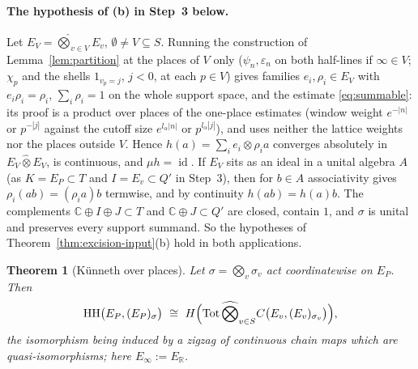 \documentclass[11pt]{amsart}
\newtheorem{theorem}{Theorem}[section]
\theoremstyle{definition}
\theoremstyle{remark}
\newcommand{\C}{\mathbb C}
\newcommand{\R}{\mathbb R}
\newcommand{\id}{\operatorname{id}}
\newcommand{\HH}{\operatorname{HH}}
\begin{document}
\paragraph{The hypothesis of (b) in Step~3 below.}
Let $E_V=\widehat\bigotimes_{v\in V}E_v$, $\emptyset\ne V\subseteq S$.  Running
the construction of Lemma~\ref{lem:partition} at the places of $V$ only
($\psi_n,\varepsilon_n$ on both half-lines if $\infty\in V$; $\chi_p$ and the
shells $1_{v_p=j}$, $j<0$, at each $p\in V$) gives families $e_i,\rho_i\in E_V$
with $e_i\rho_i=\rho_i$, $\sum_i\rho_i=1$ on the whole support space, and the
estimate \eqref{eq:summable}: its proof is a product over places of the
one-place estimates (window weight $e^{-|n|}$ or $p^{-|j|}$ against the cutoff
size $e^{l_\alpha|n|}$ or $p^{l_\alpha|j|}$), and uses neither the lattice
weights nor the places outside $V$.  Hence $h(a)=\sum_ie_i\otimes\rho_ia$
converges absolutely in $E_V\widehat\otimes E_V$, is continuous, and
$\mu h=\id$.  If $E_V$ sits as an ideal in a unital algebra $A$ (as $K=E_P\subset
T$ and $I=E_v\subset Q'$ in Step~3), then for $b\in A$ associativity gives
$\rho_i(ab)=(\rho_ia)b$ termwise, and by continuity $h(ab)=h(a)b$.  The
complements $\C\oplus I\oplus J\subset T$ and $\C\oplus J\subset Q'$ are closed,
contain $1$, and $\sigma$ is unital and preserves every support summand.  So
the hypotheses of Theorem~\ref{thm:excision-input}(b) hold in both
applications.


\begin{theorem}[K\"unneth over places]\label{thm:kunneth}
Let $\sigma=\bigotimes_v\sigma_v$ act coordinatewise on $E_P$.  Then
\begin{equation}\label{eq:kunneth}
\HH\bigl(E_P,(E_P)_{\sigma}\bigr)\ \cong\
H\Bigl(\mathrm{Tot}\,\widehat\bigotimes_{v\in S}C\bigl(E_v,(E_v)_{\sigma_v}\bigr)\Bigr),
\end{equation}
the isomorphism being induced by a zigzag of continuous chain maps which are
quasi-isomorphisms; here $E_{\infty}:=E_{\R}$.
\end{theorem}
\end{document}
